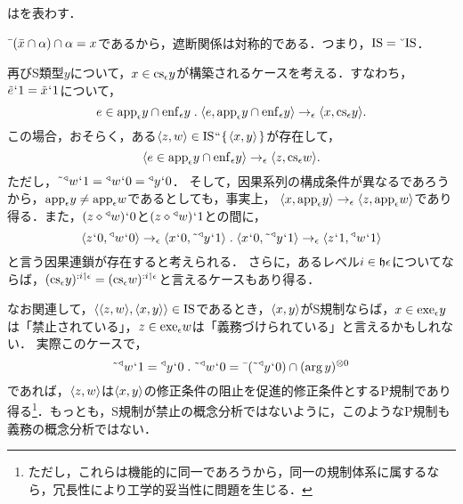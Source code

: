 \begin{df}
\label{df:遮断関係}
はを表わす．
\end{df}

\noindent $ \bar{\:\:}(\bar{x}\cap\alpha)\cap\alpha = x $であるから，遮断関係は対称的である．つまり，$ \mathrm{IS}=\breve{\:\:}\mathrm{IS} $．

再びS類型$y$について，$ x\in\mathrm{cs}_{\epsilon}y $が構築されるケースを考える．すなわち，$ \tilde{e}{\mspace{1mu}{`}\mspace{1mu}} 1 = \tilde{x}{\mspace{1mu}{`}\mspace{1mu}} 1 $について，
\[
    e\in\app{\epsilon} y\cap\enf{\epsilon}y\con{1}
    \orp{e,\app{\epsilon} y\cap\enf{\epsilon}y}\to_{\epsilon}\orp{x,\cs{\epsilon}y}.
\]
この場合，おそらく，ある$ \langle z,w \rangle\in\mathrm{IS}{\mspace{1mu}{``}\mspace{1mu}}\{\mspace{2mu}\langle x,y \rangle\mspace{2mu}\} $が存在して，
\[
    \langle e\in\mathrm{app}_{\epsilon} y\cap\mathrm{enf}_{\epsilon}y \rangle\to_{\epsilon}\langle z,\mathrm{cs}_{\epsilon}w \rangle.
\]
ただし，$ \tilde{\:\:}{^\triangleleft}w{\mspace{1mu}{`}\mspace{1mu}} 1 = {^\triangleleft}w{\mspace{1mu}{`}\mspace{1mu}} 0 = {^\triangleleft}y{\mspace{1mu}{`}\mspace{1mu}} 0 $．
そして，因果系列の構成条件が異なるであろうから，$ \mathrm{app}_{\epsilon} y \neq \mathrm{app}_{\epsilon} w $であるとしても，事実上，
$ \langle x,\mathrm{app}_{\epsilon} y \rangle\to_{\epsilon}\langle z,\mathrm{app}_{\epsilon} w \rangle $であり得る．また，$ (z\diamond{^\triangleleft}w){\mspace{1mu}{`}\mspace{1mu}} 0 $と$ (z\diamond{^\triangleleft}w){\mspace{1mu}{`}\mspace{1mu}} 1 $との間に，
\[
   \orp{z\fap 0,\trgl{w}\fap 0}\to_{\epsilon}\orp{x\fap 0,\tildel{\trgl{y}}\fap 1}\con{1}
    \orp{x\fap 0,\tildel{\trgl{y}}\fap 1}\to_{\epsilon}\orp{z\fap 1,\trgl{w}\fap 1}
\]
と言う因果連鎖が存在すると考えられる．
さらに，あるレベル$ i\in\mathfrak{h}\epsilon $についてならば，$ (\mathrm{cs}_{\epsilon}y)^{:i\mathbin{\upharpoonleft}\epsilon} = (\mathrm{cs}_{\epsilon}w)^{:i\mathbin{\upharpoonleft}\epsilon} $と言えるケースもあり得る．

なお関連して，$ \langle \langle z,w \rangle,\langle x,y \rangle \rangle\in\mathrm{IS} $であるとき，$ \langle x,y \rangle $がS規制ならば，$ x\in\mathrm{exe}_{\epsilon} y $は「禁止されている」，$ z\in\mathrm{exe}_{\epsilon} w $は「義務づけられている」と言えるかもしれない．
実際このケースで，
\[
    \tildel{\trgl{w}}\fap 1 = \trgl{y}\fap 0\con{1}
    \tildel{\trgl{w}}\fap 0 = \barl{(\tildel{\trgl{y}}\fap 0)}\cap\mser{(\arg y)}{0}
\]
であれば，$ \langle z,w \rangle $は$ \langle x,y \rangle $の修正条件の阻止を促進的修正条件とするP規制であり得る\footnote{
    ただし，これらは機能的に同一であろうから，同一の規制体系に属するなら，冗長性により工学的妥当性に問題を生じる．
}．もっとも，S規制が禁止の概念分析ではないように，このようなP規制も義務の概念分析ではない．

